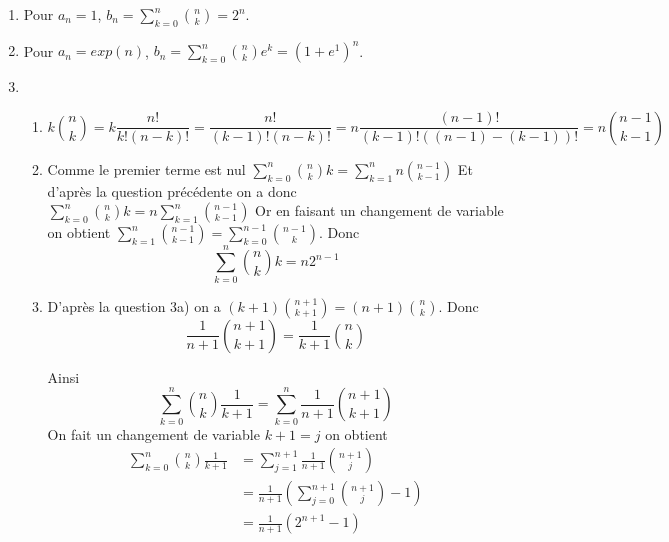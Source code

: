 \documentclass[a4paper, 11pt,reqno]{article}
\begin{document}
\begin{correction}

\begin{enumerate}
\item Pour $a_n=1$, $b_n=\sum_{k=0}^n \binom{n}{k}  =2^n$.
\item  Pour $a_n=exp(n)$, $b_n=\sum_{k=0}^n \binom{n}{k}e^k  =(1+e^1)^n$.
\item
\begin{enumerate}
\item  $$k\binom{n}{k}= k \frac{n! }{k! (n-k)!} = \frac{n! }{(k-1)! (n-k)!}  = n \frac{(n-1)! }{(k-1)! ((n-1)-(k-1))!}=  n\binom{n-1}{k-1}$$
\item
Comme le premier terme est nul  $\sum_{k=0}^n \binom{n}{k} k = \sum_{k=1}^n n\binom{n-1}{k-1}$
Et d'après la question précédente on a donc $ \sum_{k=0}^n \binom{n}{k} k= n  \sum_{k=1}^n \binom{n-1}{k-1}$
Or en faisant un changement de variable on obtient $\sum_{k=1}^n \binom{n-1}{k-1}= \sum_{k=0}^{n-1} \binom{n-1}{k}$. 
Donc $$ \sum_{k=0}^n \binom{n}{k} k = n 2^{n-1}$$

\item 
D'après la question 3a) on a $ (k+1)\binom{n+1}{k+1} = (n+1)\binom{n}{k}$. Donc 
$$\frac{1}{n+1}\binom{n+1}{k+1} =\frac{1}{k+1}\binom{n}{k}$$

Ainsi $$\sum_{k=0}^n \binom{n}{k} \frac{1}{k+1} = \sum_{k=0}^{n} \frac{1}{n+1}\binom{n+1}{k+1}$$
On fait un changement de variable $k+1=j$ on obtient 
\begin{align*}
\sum_{k=0}^n \binom{n}{k} \frac{1}{k+1} &=  \sum_{j=1}^{n+1} \frac{1}{n+1}\binom{n+1}{j}\\
															&=  \frac{1}{n+1} \left( \sum_{j=0}^{n+1} \binom{n+1}{j} -1\right)\\
															&= \frac{1}{n+1} \left( 2^{n+1}-1\right)
\end{align*}
\end{enumerate}
\end{enumerate}
\end{correction}


\vspace{0.5cm}
\end{document}
